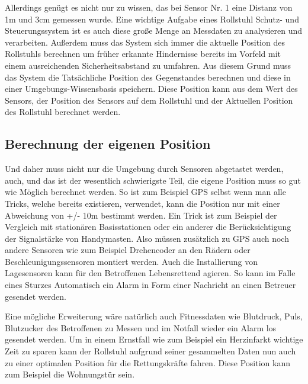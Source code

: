 Allerdings genügt es nicht nur zu wissen, das bei Sensor Nr. 1 eine Distanz von 1m und 3cm gemessen wurde.
Eine wichtige Aufgabe eines Rollstuhl Schutz- und Steuerungssystem ist es auch diese große Menge an Messdaten zu analysieren und verarbeiten.
Außerdem muss das System sich immer die aktuelle Position des Rollstuhls berechnen um früher erkannte Hindernisse bereits im Vorfeld mit einem ausreichenden Sicherheitsabstand zu umfahren.
Aus diesem Grund muss das System die Tatsächliche Position des Gegenstandes berechnen und diese in einer Umgebungs-Wissensbasis speichern.
Diese Position kann aus dem Wert des Sensors, der Position des Sensors auf dem Rollstuhl und der Aktuellen Position des Rollstuhl berechnet werden.


\subsection{Berechnung der eigenen Position}
Und daher muss nicht nur die Umgebung durch Sensoren abgetastet werden, auch, und das ist der wesentlich schwierigste Teil, die eigene Position muss so gut wie Möglich berechnet werden.
So ist zum Beispiel GPS selbst wenn man alle Tricks, welche bereits existieren, verwendet, kann die Position nur mit einer Abweichung von +/- 10m bestimmt werden.
Ein Trick ist zum Beispiel der Vergleich mit stationären Basisstationen oder ein anderer die Berücksichtigung der Signalstärke von Handymasten.
Also müssen zusätzlich zu GPS auch noch andere Sensoren wie zum Beispiel Drehencoder an den Rädern oder Beschleunigungssensoren montiert werden.
Auch die Installierung von Lagesensoren kann für den Betroffenen Lebensrettend agieren.
So kann im Falle eines Sturzes Automatisch ein Alarm in Form einer Nachricht an einen Betreuer gesendet werden.

Eine mögliche Erweiterung wäre natürlich auch Fitnessdaten wie Blutdruck, Puls, Blutzucker des Betroffenen zu Messen und im Notfall wieder ein Alarm los gesendet werden.
Um in einem Ernstfall wie zum Beispiel ein Herzinfarkt wichtige Zeit zu sparen kann der Rollstuhl aufgrund seiner gesammelten Daten nun auch zu einer optimalen Position für die Rettungskräfte fahren.
Diese Position kann zum Beispiel die Wohnungstür sein.


